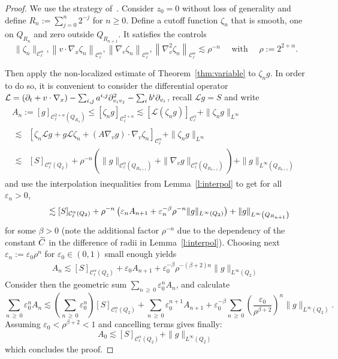 \documentclass[AHL,Unicode,longabstracts,published]{cedram}
\newcommand{\cC}{\mathcal{C}}
\newcommand{\cL}{\mathcal{L}}
\newcommand*\eps{\varepsilon}
\let\oldtilde\tilde
\renewcommand*{\tilde}[1]{\mathchoice{\widetilde{#1}}{\widetilde{#1}}{\oldtilde{#1}}{\oldtilde{#1}}}
\begin{document}
\begin{proof}
We use the strategy of~\cite[Theorem~8.11.1]{krylov1996}. Consider $z_0=0$ without loss of generality and define $R_n := \sum_{j =0}^n 2^{-j}$ for $n \ge 0$. Define a cutoff function $\zeta_n$ that is smooth, one on $Q_{R_n}$ and zero outside $Q_{R_{n+1}}$. It satisfies the controls
\[
\| \zeta_n \|_{\cC_\ell^{\alpha}}, \left\| v \cdot \nabla_x \zeta_n
\right\|_{\cC_\ell^{\alpha}}, \left\| \nabla_v \zeta_n \right\|_{\cC_\ell^{\alpha}}, \left\|
\nabla_v ^2 \zeta_n \right\|_{\cC_\ell^{\alpha}} \lesssim \rho^{-n} \quad
\text{ with } \quad \rho :=2^{2+\alpha}.
\]


Then apply the non-localized estimate of Theorem~\ref{thm:variable} to $\zeta_n g$. In order to do so, it is convenient to consider the differential operator $\cL = (\partial_t + v \cdot \nabla_x) - \sum_{i,j} a^{i,j}
\partial^2_{v_i v_j}\linebreak- \sum_i b^i \partial_{v_i}$, recall $\cL g =S$ and write
\begin{multline*}
A_n := [g]_{\cC_\ell^{2+\alpha}\left(Q_{R_n}\right)} \le [\zeta_n g]_{\cC_\ell^{2+\alpha}}
\lesssim [\cL (\zeta_n g)]_{\cC_\ell^{\alpha}} + \| \zeta_n g \|_{L^\infty} \\
\begin{aligned}
\lesssim & \left[\zeta_n \cL g + g \cL \zeta_n + \left(A \nabla_v g\right) \cdot \nabla_v \zeta_n
\right]_{\cC_\ell^{\alpha}} + \| \zeta_n g \|_{L^\infty} \\
\lesssim & [S]_{\cC_\ell^{\alpha}(Q_2)} + \rho^{-n}
\left(\| g\|_{\cC_\ell^{\alpha}\left(Q_{R_{n+1}}\right)} + \| \nabla_v g\|_{\cC_\ell^{\alpha}\left(Q_{R_{n+1}}\right)}\right) +\|g\|_{L^\infty\left(Q_{R_{n+1}}\right)}
\end{aligned}
\end{multline*}
and use the interpolation inequalities from Lemma~\ref{l:interpol} to get for all $\eps_n >0$,
\[
\mkern60mu\lesssim [S]_{\cC_\ell^{\alpha}(Q_2)} + \rho^{-n} \left(\eps_n A_{n+1} + \eps_n^{-\beta} \rho^{-n} \|g\|_{L^\infty(Q_2)}\right) + \|g\|_{L^\infty\left(Q_{R_{n+1}}\right)}
\]
for some $\beta >0$ (note the additional factor $\rho^{-n}$ due to the dependency of the constant $\tilde{C}$ in the difference of radii in Lemma~\ref{l:interpol}). Choosing next $\eps_n := \eps_0 \rho^n$ for $\eps_0 \in (0,1)$ small enough yields
\begin{align*}
A_n \lesssim [S]_{\cC_\ell^{\alpha}(Q_2)} + \eps_0 A_{n+1} + \eps_0 ^{-\beta} \rho^{-(\beta+2) n} \| g \|_{L^\infty(Q_2)}
\end{align*}
Consider then the geometric sum $\sum_{n\,\ge \,0} \eps_0 ^n A_n$, and calculate
\[
\sum_{n\,\ge\,0} \eps_0^n A_n \lesssim \left(\sum_{n\,\ge\, 0}
\eps_0^n \right) [S]_{\cC_\ell^{\alpha}(Q_{2})} + \sum_{n\, \ge\,0}
\eps_0^{n+1} A_{n+1} + \eps_0 ^{-\beta}
\sum_{n\,\ge\,0} \left(
\frac{\eps_0}{\rho^{\beta+2}} \right) ^n
\| g \|_{L^\infty(Q_2)}.
\]
Assuming $\eps_0 < \rho^{\beta+2}<1$ and cancelling terms gives finally:
\[
A_0 \lesssim [S]_{\cC_\ell^{\alpha}(Q_{2})} + \| g \|_{L^\infty(Q_2)}
\]
which concludes the proof.
\end{proof}
\end{document}
